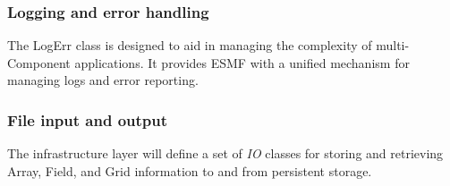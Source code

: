 \subsubsection{Logging and error handling}
The LogErr class is designed to aid in managing the complexity of 
multi-Component applications. It provides ESMF with a unified mechanism 
for managing logs and error reporting.

\subsubsection{File input and output}
The infrastructure layer will define a set of {\it IO} classes for storing and 
retrieving Array, Field, and Grid information to and from persistent storage.
